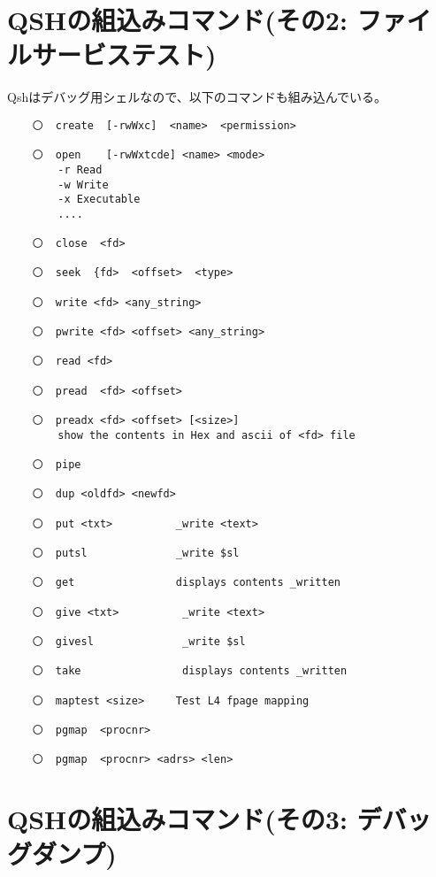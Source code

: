 \section{QSHの組込みコマンド(その2: ファイルサービステスト)}

   Qshはデバッグ用シェルなので、以下のコマンドも組み込んでいる。

\begin{verbatim}   
    〇  create  [-rwWxc]  <name>  <permission>
    
    〇  open    [-rwWxtcde] <name> <mode> 
        -r Read
        -w Write
        -x Executable 
        ....	
    
    〇  close  <fd>
    
    〇  seek  {fd>  <offset>  <type>
    
    〇  write <fd> <any_string>

    〇  pwrite <fd> <offset> <any_string>
    
    〇  read <fd> 

    〇  pread  <fd> <offset>      

    〇  preadx <fd> <offset> [<size>]  
        show the contents in Hex and ascii of <fd> file 
    
    〇  pipe

    〇  dup <oldfd> <newfd>
    
    〇  put <txt>          _write <text>

    〇  putsl              _write $sl 

    〇  get                displays contents _written
    
    〇  give <txt>          _write <text>

    〇  givesl              _write $sl

    〇  take                displays contents _written

    〇  maptest <size>     Test L4 fpage mapping

    〇  pgmap  <procnr> 

    〇  pgmap  <procnr> <adrs> <len>
\end{verbatim}   
    

\section{QSHの組込みコマンド(その3: デバッグダンプ)}

